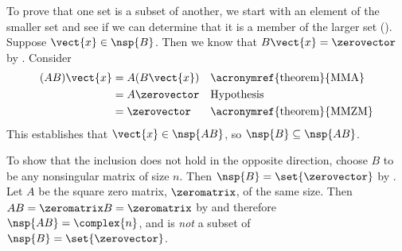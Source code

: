 To prove that one set is a subset of another, we start with an element of the smaller set and see if we can determine that it is a member of the larger set ().  Suppose $\vect{x}\in\nsp{B}$.  Then we know that $B\vect{x}=\zerovector$ by .  Consider
%
\begin{align*}
(AB)\vect{x}&=A(B\vect{x})&&\text{\acronymref{theorem}{MMA}}\\
&=A\zerovector&&\text{Hypothesis}\\
&=\zerovector&&\text{\acronymref{theorem}{MMZM}}\\
\end{align*}
%
This establishes that $\vect{x}\in\nsp{AB}$, so $\nsp{B}\subseteq\nsp{AB}$.\par
%
To show that the inclusion does not hold in the opposite direction, choose $B$ to be any nonsingular matrix of size $n$.  Then $\nsp{B}=\set{\zerovector}$ by .  Let $A$ be the square zero matrix, $\zeromatrix$, of the same size.  Then $AB=\zeromatrix B=\zeromatrix$ by  and therefore $\nsp{AB}=\complex{n}$, and is {\em not} a subset of $\nsp{B}=\set{\zerovector}$.
